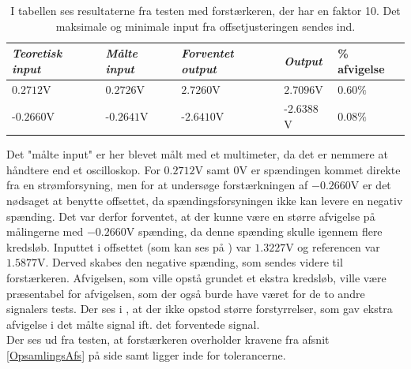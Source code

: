 \begin{table}[H]
	\centering
	\begin{tabular}{|l|l|l|l|l|}
		\hline
		\textit{Teoretisk input} & \textit{Målte input} & \textit{Forventet output} & \textit{Output} & \% afvigelse \\ \hline
		$0.2712$V   & $0.2726$V    & $2.7260$V     & $2.7096$V       & $0.60\%$     \\ \hline
		-$0.2660$V  & -$0.2641$V   & -$2.6410$V    & -$2.6388$V      & $0.08\%$     \\ \hline
	\end{tabular}
	\caption{I tabellen ses resultaterne fra testen med forstærkeren, der har en faktor 10. Det maksimale og minimale input fra offsetjusteringen sendes ind.}
	\label{Tab:faktor18_test}
\end{table}
Det "målte input" er her blevet målt med et multimeter, da det er nemmere at håndtere end et oscilloskop. For $0.2712$V samt $0$V er spændingen kommet direkte fra en strømforsyning, men for at undersøge forstærkningen af $-0.2660$V er det nødsaget at benytte offsettet, da spændingsforsyningen ikke kan levere en negativ spænding. Det var derfor forventet, at der kunne være en større afvigelse på målingerne med $-0.2660$V spænding, da denne spænding skulle igennem flere kredsløb. Inputtet i offsettet (som kan ses på ) var $1.3227$V og referencen var $1.5877$V. Derved skabes den negative spænding, som sendes videre til forstærkeren. Afvigelsen, som ville opstå grundet et ekstra kredsløb, ville være præsentabel for afvigelsen, som der også burde have været for de to andre signalers tests. Der ses i , at der ikke opstod større forstyrrelser, som gav ekstra afvigelse i det målte signal ift. det forventede signal. \\
Der ses ud fra testen, at forstærkeren overholder kravene fra afsnit \ref{OpsamlingsAfs} på side \pageref{OpsamlingsAfs} samt ligger inde for tolerancerne.